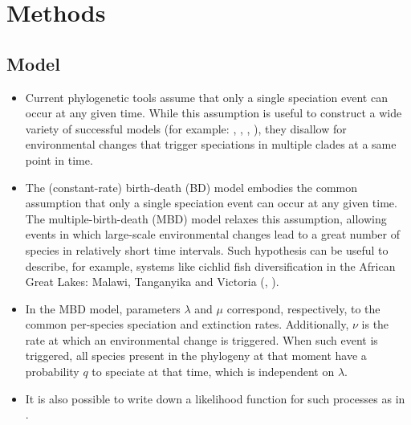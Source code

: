 \documentclass{article}
\begin{document}
\section{Methods}

\subsection{Model}
\begin{itemize}

\item Current phylogenetic tools assume that only a single speciation event can occur at any given time.
While this assumption is useful to construct a wide variety of successful 
models (for example: \cite{Maddison2007biSSE}, \cite{Valente2015}, \cite{etienne2012diversity}, \cite{etienne2014estimating}),
they disallow for environmental changes that trigger speciations in multiple clades at a same point in time.

\item The (constant-rate) birth-death (BD) model embodies the common assumption that 
only a single speciation event can occur at any given time.
The multiple-birth-death (MBD) model relaxes this assumption, allowing events in which 
large-scale environmental changes lead to a great number of species 
in relatively short time intervals. Such hypothesis can be useful to describe, for example, 
systems like cichlid fish diversification in the 
African Great Lakes: Malawi, Tanganyika and Victoria (\cite{janzen2016}, \cite{janzen2017}).

\item In the MBD model, parameters $\lambda$ and $\mu$ correspond, respectively, 
to the common per-species speciation and extinction rates. 
Additionally, $\nu$ is the rate at which an environmental change is triggered.
When such event is triggered, all species present in the phylogeny at that moment
have a probability $q$ to speciate at that time, which is 
independent on $\lambda$. 

\item It is also possible to write down a likelihood function for such processes as in \cite{mbd}.
    
\end{itemize}
\end{document}
